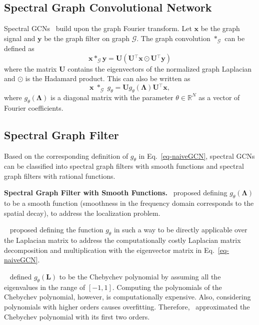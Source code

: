 \documentclass[runningheads]{llncs}
\renewcommand{\vec}[1]{\ensuremath{\mathbf{#1}}}
\newcommand{\mat}[1]{\ensuremath{\mathbf{#1}}}
\newcommand{\transpose}{\ensuremath{^\top}}
\begin{document}
\subsection{Spectral Graph Convolutional Network}
Spectral GCNs~\cite{bruna2013spectral} build upon the  graph Fourier transform. Let $\vec{x}$ be the graph signal and $\vec{y}$ be the graph filter on graph $\mathcal{G}$. The graph convolution $\ast_\mathcal{G}$ can be defined as
\begin{equation}
    \vec{x} \ast_\mathcal{G} \vec{y} = \mat{U}(\mat{U}\transpose\vec{x} \odot \mat{U}\transpose\vec{y}) \label{naiveGCN}
\end{equation}
where the matrix $\mat{U}$ contains the eigenvectors of the normalized graph Laplacian and $\odot$ is the Hadamard product.
This can also be written as
 \begin{equation}
    \vec{x} \;\ast_\mathcal{G} \; g_\theta = \mat{U}g_{\theta}(\mat{\Lambda})\mat{U}\transpose\vec{x},
    \label{eq-naiveGCN}
\end{equation}
where $g_{\theta}(\mat{\Lambda})$ is a diagonal matrix with the parameter $\theta \in \mathbb{R}^N$ as a vector of Fourier coefficients.



\subsection{Spectral Graph Filter}
Based on the corresponding definition of $g_\theta$ in Eq.~\eqref{eq-naiveGCN}, spectral GCNs can be classified into spectral graph filters with smooth functions and spectral graph filters with rational functions.

\textbf{Spectral Graph Filter with Smooth Functions.}~\citet{henaff2015deep} proposed defining $g_{\theta}(\boldsymbol{\Lambda})$ to be a smooth function (smoothness in the frequency domain corresponds to the spatial decay), to address the localization problem.

 ~\citet{defferrard2016convolutional} proposed defining the function $g_{\theta}$ in such a way to be directly applicable over the Laplacian matrix to address the computationally costly Laplacian matrix decomposition and multiplication with the eigenvector matrix in Eq.~\eqref{eq-naiveGCN}.

~\citet{kipf2016semi} defined $g_{\theta}(\mathbf{L})$ to be the Chebychev polynomial by assuming all the eigenvalues in the range of $[-1, 1]$. Computing the polynomials of the Chebychev polynomial, however, is computationally expensive. Also, considering polynomials with higher orders causes overfitting. Therefore,~\citet{kipf2016semi} approximated the Chebychev polynomial with its first two orders.
\end{document}
